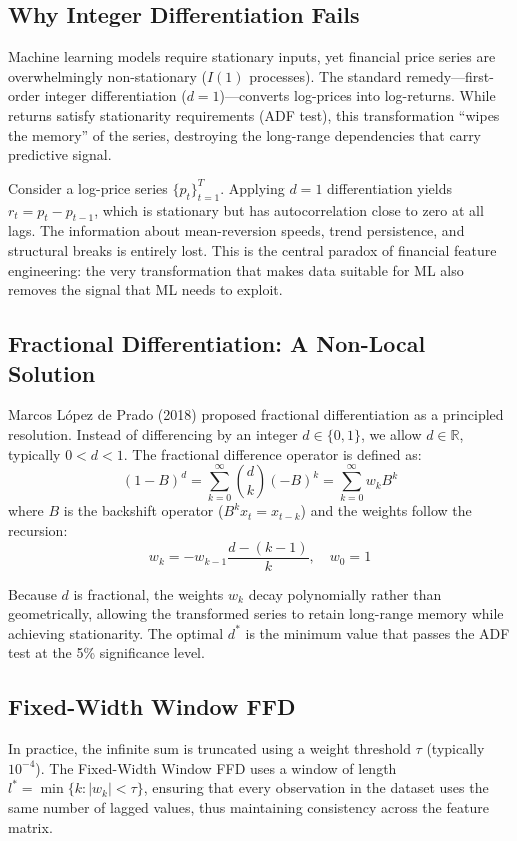 \documentclass[conference]{IEEEtran}
\begin{document}
\subsection{Why Integer Differentiation Fails}
Machine learning models require stationary inputs, yet financial price series are overwhelmingly non-stationary ($I(1)$ processes). The standard remedy---first-order integer differentiation ($d = 1$)---converts log-prices into log-returns. While returns satisfy stationarity requirements (ADF test), this transformation ``wipes the memory'' of the series, destroying the long-range dependencies that carry predictive signal.

Consider a log-price series $\{p_t\}_{t=1}^{T}$. Applying $d=1$ differentiation yields $r_t = p_t - p_{t-1}$, which is stationary but has autocorrelation close to zero at all lags. The information about mean-reversion speeds, trend persistence, and structural breaks is entirely lost. This is the central paradox of financial feature engineering: the very transformation that makes data suitable for ML also removes the signal that ML needs to exploit.

\subsection{Fractional Differentiation: A Non-Local Solution}
Marcos L\'{o}pez de Prado (2018) proposed fractional differentiation as a principled resolution. Instead of differencing by an integer $d \in \{0, 1\}$, we allow $d \in \mathbb{R}$, typically $0 < d < 1$. The fractional difference operator is defined as:
\begin{equation}
(1 - B)^d = \sum_{k=0}^{\infty} \binom{d}{k}(-B)^k = \sum_{k=0}^{\infty} w_k B^k
\end{equation}
where $B$ is the backshift operator ($B^k x_t = x_{t-k}$) and the weights follow the recursion:
\begin{equation}
w_k = -w_{k-1} \frac{d - (k-1)}{k}, \quad w_0 = 1
\end{equation}

Because $d$ is fractional, the weights $w_k$ decay polynomially rather than geometrically, allowing the transformed series to retain long-range memory while achieving stationarity. The optimal $d^*$ is the minimum value that passes the ADF test at the 5\% significance level.

\subsection{Fixed-Width Window FFD}
In practice, the infinite sum is truncated using a weight threshold $\tau$ (typically $10^{-4}$). The Fixed-Width Window FFD uses a window of length $l^* = \min\{k : |w_k| < \tau\}$, ensuring that every observation in the dataset uses the same number of lagged values, thus maintaining consistency across the feature matrix.
\end{document}
